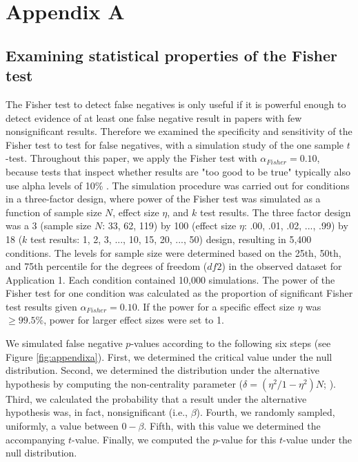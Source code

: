 \documentclass{article}
\begin{document}
\section*{Appendix A}
\label{apA}
\subsection*{Examining statistical properties of the Fisher test}
The Fisher test to detect false negatives is only useful if it is powerful enough to detect evidence of at least one false negative result in papers with few nonsignificant results. Therefore we examined the specificity and sensitivity of the Fisher test to test for false negatives, with a simulation study of the one sample $t$-test. Throughout this paper, we apply the Fisher test with $\alpha_{Fisher}=0.10$, because tests that inspect whether results are "too good to be true" typically also use alpha levels of 10\% \cite{Sterne2000-wh,Ioannidis2007-hh,Francis2012-kw}. The simulation procedure was carried out for conditions in a three-factor design, where power of the Fisher test was simulated as a function of sample size $N$, effect size $\eta$, and $k$ test results. The three factor design was a 3 (sample size $N$: 33, 62, 119) by 100 (effect size $\eta$: .00, .01, .02, ..., .99) by 18 ($k$ test results: 1, 2, 3, ..., 10, 15, 20, ..., 50) design, resulting in 5,400 conditions. The levels for sample size were determined based on the 25th, 50th, and 75th percentile for the degrees of freedom ($df2$) in the observed dataset for Application 1. Each condition contained 10,000 simulations. The power of the Fisher test for one condition was calculated as the proportion of significant Fisher test results given $\alpha_{Fisher}=0.10$. If the power for a specific effect size $\eta$ was $\geq99.5\%$, power for larger effect sizes were set to 1.

We simulated false negative $p$-values according to the following six steps (see Figure \ref{fig:appendixa}). First, we determined the critical value under the null distribution. Second, we determined the distribution under the alternative hypothesis by computing the non-centrality parameter ($\delta=(\eta^2/1-\eta^2)N$; \cite{Steiger1997-qq,Smithson2001-aw}). Third, we calculated the probability that a result under the alternative hypothesis was, in fact, nonsignificant (i.e., $\beta$). Fourth, we randomly sampled, uniformly, a value between $0-\beta$. Fifth, with this value we determined the accompanying $t$-value. Finally, we computed the $p$-value for this $t$-value under the null distribution. 
\end{document}
